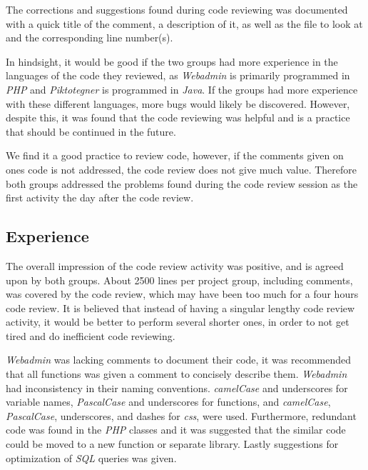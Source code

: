 The corrections and suggestions found during code reviewing was documented with a quick title of the comment, a description of it, as well as the file to look at and the corresponding line number(s).

In hindsight, it would be good if the two groups had more experience in the languages of the code they reviewed, as \textit{Webadmin} is primarily programmed in \textit{PHP} and \textit{Piktotegner} is programmed in \textit{Java}.
If the groups had more experience with these different languages, more bugs would likely be discovered.
However, despite this, it was found that the code reviewing was helpful and is a practice that should be continued in the future.

We find it a good practice to review code, however, if the comments given on ones code is not addressed, the code review does not give much value.
Therefore both groups addressed the problems found during the code review session as the first activity the day after the code review.

\subsection*{Experience}
The overall impression of the code review activity was positive, and is agreed upon by both groups.
About 2500 lines per project group, including comments, was covered by the code review, which may have been too much for a four hours code review.
It is believed that instead of having a singular lengthy code review activity, it would be better to perform several shorter ones, in order to not get tired and do inefficient code reviewing.

\textit{Webadmin} was lacking comments to document their code, it was recommended that all functions was given a comment to concisely describe them. 
\textit{Webadmin} had inconsistency in their naming conventions. 
\textit{camelCase} and underscores for variable names, \textit{PascalCase} and underscores for functions, and \textit{camelCase}, \textit{PascalCase}, underscores, and dashes for \textit{css}, were used. 
Furthermore, redundant code was found in the \textit{PHP} classes and it was suggested that the similar code could be moved to a new function or separate library. 
Lastly suggestions for optimization of \textit{SQL} queries was given.

